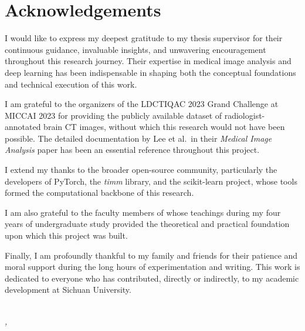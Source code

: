 \chapter*{Acknowledgements}

\vspace{1cm}

I would like to express my deepest gratitude to my thesis supervisor for their continuous
guidance, invaluable insights, and unwavering encouragement throughout this research
journey. Their expertise in medical image analysis and deep learning has been
indispensable in shaping both the conceptual foundations and technical execution of
this work.

I am grateful to the organizers of the LDCTIQAC 2023 Grand Challenge at MICCAI 2023 for
providing the publicly available dataset of radiologist-annotated brain CT images, without
which this research would not have been possible. The detailed documentation by Lee et al.\
in their \textit{Medical Image Analysis} paper has been an essential reference throughout
this project.

I extend my thanks to the broader open-source community, particularly the developers of
PyTorch, the \textit{timm} library, and the scikit-learn project, whose tools formed the
computational backbone of this research.

I am also grateful to the faculty members of \textbf{\thesisschool}
whose teachings during my four years of undergraduate study provided
the theoretical and practical foundation upon which this project was built.

Finally, I am profoundly thankful to my family and friends for their patience and moral
support during the long hours of experimentation and writing. This work is dedicated to
everyone who has contributed, directly or indirectly, to my academic development at
Sichuan University.

\vspace{2cm}

\noindent
\textit{\thesisauthor}\\
\textit{\thesisschool, \thesismajor}\\
\textit{\thesisdate}
